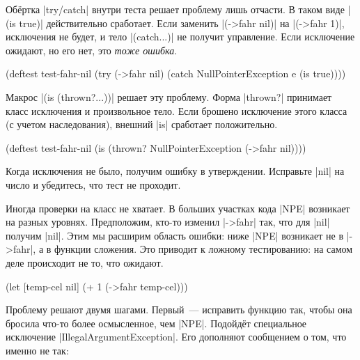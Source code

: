 Обёртка \spverb|try/catch| внутри теста решает проблему лишь отчасти. В
таком виде \spverb|(is true)| действительно сработает. Если заменить
\spverb|(->fahr nil)| на \spverb|(->fahr 1)|, исключения не будет, и тело
\spverb|(catch...)| не получит управление. Если исключение ожидают, но его нет,
это \emph{тоже ошибка}.


\begin{english}
  \begin{clojure}
(deftest test-fahr-nil
  (try
    (->fahr nil)
    (catch NullPointerException e
      (is true))))
  \end{clojure}
\end{english}

Макрос \spverb|(is (thrown?...))| решает эту проблему. Форма \spverb|thrown?|
принимает класс исключения и произвольное тело. Если брошено исключение этого
класса (с учетом наследования), внешний \spverb|is| сработает
положительно.

\begin{english}
  \begin{clojure}
(deftest test-fahr-nil
  (is (thrown? NullPointerException
               (->fahr nil))))
  \end{clojure}
\end{english}

Когда исключения не было, получим ошибку в утверждении. Исправьте \spverb|nil|
на число и убедитесь, что тест не проходит.


Иногда проверки на класс не хватает. В больших участках кода \spverb|NPE|
возникает на разных уровнях. Предположим, кто-то изменил \spverb|->fahr| так,
что для \spverb|nil| получим \spverb|nil|. Этим мы расширим область ошибки: ниже
\spverb|NPE| возникает не в \spverb|->fahr|, а в функции сложения. Это приводит
к ложному тестированию: на самом деле происходит не то, что ожидают.

\begin{english}
  \begin{clojure}
(let [temp-cel nil]
  (+ 1 (->fahr temp-cel)))
  \end{clojure}
\end{english}

\label{illegal-arg}

Проблему решают двумя шагами. Первый~--- исправить функцию так, чтобы она
бросила что-то более осмысленное, чем \spverb|NPE|. Подойдёт специальное
исключение \spverb|IllegalArgumentException|. Его дополняют сообщением о том,
что именно не так:

